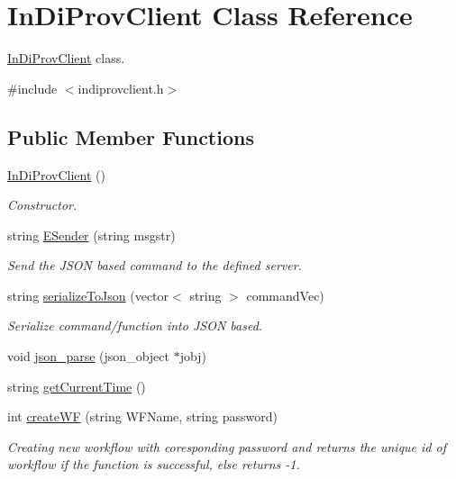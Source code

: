 \hypertarget{class_in_di_prov_client}{\section{In\-Di\-Prov\-Client Class Reference}
\label{class_in_di_prov_client}
}


\hyperlink{class_in_di_prov_client}{In\-Di\-Prov\-Client} class.  




{\ttfamily \#include $<$indiprovclient.\-h$>$}

\subsection*{Public Member Functions}
\begin{DoxyCompactItemize}
\item 
\hyperlink{class_in_di_prov_client_a33dfecf362dc5d453ef2907834bbe09c}{In\-Di\-Prov\-Client} ()
\begin{DoxyCompactList}\small\item\em Constructor. \end{DoxyCompactList}\item 
string \hyperlink{class_in_di_prov_client_aa25fc27aead871d3a8103e27997cb2c6}{E\-Sender} (string msgstr)
\begin{DoxyCompactList}\small\item\em Send the J\-S\-O\-N based command to the defined server. \end{DoxyCompactList}\item 
string \hyperlink{class_in_di_prov_client_af7cb9082299c4dd099c176b55899dff0}{serialize\-To\-Json} (vector$<$ string $>$ command\-Vec)
\begin{DoxyCompactList}\small\item\em Serialize command/function into J\-S\-O\-N based. \end{DoxyCompactList}\item 
void \hyperlink{class_in_di_prov_client_ae4bca8e968f14753a1fd6e7b59b92f3c}{json\-\_\-parse} (json\-\_\-object $\ast$jobj)
\item 
string \hyperlink{class_in_di_prov_client_a6844299f790bb3e1f460b64fca2a2585}{get\-Current\-Time} ()
\item 
int \hyperlink{class_in_di_prov_client_aa8d9cbc951a6fd184e5156c3da84bc14}{create\-W\-F} (string W\-F\-Name, string password)
\begin{DoxyCompactList}\small\item\em Creating new workflow with coresponding password and returns the unique id of workflow if the function is successful, else returns -\/1. \end{DoxyCompactList}\item 

\end{DoxyCompactItemize}
